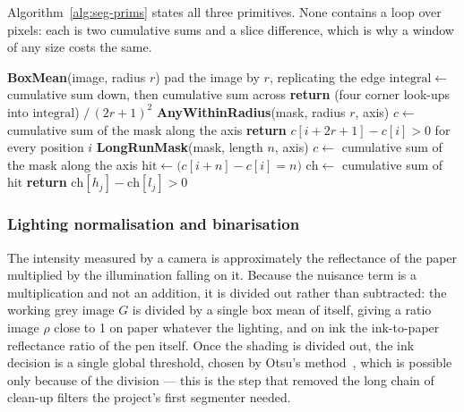 Algorithm~\ref{alg:seg-prims} states all three primitives. None contains a loop over pixels: each is two cumulative sums and a slice difference, which is why a window of any size costs the same.

\begin{algorithm}[!htbp]
\caption{The three array primitives, each independent of window size}
\label{alg:seg-prims}
\begin{algorithmic}[1]
\STATE \textbf{BoxMean}(image, radius $r$) 
\STATE \quad pad the image by $r$, replicating the edge
\STATE \quad $\mathrm{integral}\leftarrow$ cumulative sum down, then cumulative sum across 
\STATE \quad \textbf{return} (four corner look-ups into $\mathrm{integral}$) $/\,(2r+1)^2$ 
\STATE
\STATE \textbf{AnyWithinRadius}(mask, radius $r$, axis) 
\STATE \quad $c\leftarrow$ cumulative sum of the mask along the axis
\STATE \quad \textbf{return} $c[i+2r+1]-c[i]>0$ for every position $i$
\STATE
\STATE \textbf{LongRunMask}(mask, length $n$, axis) 
\STATE \quad $c\leftarrow$ cumulative sum of the mask along the axis
\STATE \quad $\mathrm{hit}\leftarrow\bigl(c[i+n]-c[i]=n\bigr)$ 
\STATE \quad $\mathrm{ch}\leftarrow$ cumulative sum of $\mathrm{hit}$
\STATE \quad \textbf{return} $\mathrm{ch}[h_j]-\mathrm{ch}[l_j]>0$ 
\end{algorithmic}
\end{algorithm}

\subsubsection{Lighting normalisation and binarisation}
\label{sec:seg-binarise}

The intensity measured by a camera is approximately the reflectance of the paper multiplied by the illumination falling on it. Because the nuisance term is a multiplication and not an addition, it is divided out rather than subtracted: the working grey image $G$ is divided by a single box mean of itself, giving a ratio image $\rho$ close to 1 on paper whatever the lighting, and on ink the ink-to-paper reflectance ratio of the pen itself. Once the shading is divided out, the ink decision is a single global threshold, chosen by Otsu's method~\cite[p.~63]{otsu1979}, which is possible only because of the division --- this is the step that removed the long chain of clean-up filters the project's first segmenter needed.

